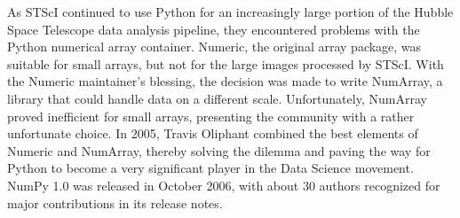 \documentclass[fleqn,10pt]{wlscirep}
\begin{document}




As STScI continued to use Python for an increasingly large portion
of the Hubble Space Telescope data analysis pipeline, they encountered
problems with the Python numerical array container.
Numeric, the original array package, was
suitable for small arrays, but not for the large images processed by
STScI.  With the Numeric maintainer's blessing, the decision was made
to write NumArray, a library that could handle data on a different
scale.  Unfortunately, NumArray proved inefficient for small arrays,
presenting the community with a rather unfortunate choice.  In 2005,
Travis Oliphant combined the best elements of Numeric and NumArray,
thereby solving the dilemma and paving the way for Python to become
a very significant player in the Data Science movement. NumPy
1.0 was released in October 2006\cite{numpy-1.0-tag}, with about 30
authors recognized for major contributions in its release notes.

\end{document}

